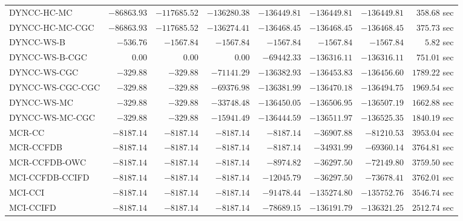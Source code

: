 \begin{table}[H]
\begin{tabular}{lrrrrrrr}
         DYNCC-HC-MC & $    -86863.93$ & $   -117685.52$ & $   -136280.38$ & $   -136449.81$ & $   -136449.81$ & $   -136449.81$ & $       358.68$ sec   \\ 
     DYNCC-HC-MC-CGC & $    -86863.93$ & $   -117685.52$ & $   -136274.41$ & $   -136468.45$ & $   -136468.45$ & $   -136468.45$ & $       375.73$ sec   \\ 
          DYNCC-WS-B & $      -536.76$ & $     -1567.84$ & $     -1567.84$ & $     -1567.84$ & $     -1567.84$ & $     -1567.84$ & $         5.82$ sec   \\ 
      DYNCC-WS-B-CGC & $         0.00$ & $         0.00$ & $         0.00$ & $    -69442.33$ & $   -136316.11$ & $   -136316.11$ & $       751.01$ sec   \\ 
        DYNCC-WS-CGC & $      -329.88$ & $      -329.88$ & $    -71141.29$ & $   -136382.93$ & $   -136453.83$ & $   -136456.60$ & $      1789.22$ sec   \\ 
    DYNCC-WS-CGC-CGC & $      -329.88$ & $      -329.88$ & $    -69376.98$ & $   -136381.99$ & $   -136470.18$ & $   -136494.75$ & $      1969.54$ sec   \\ 
         DYNCC-WS-MC & $      -329.88$ & $      -329.88$ & $    -33748.48$ & $   -136450.05$ & $   -136506.95$ & $   -136507.19$ & $      1662.88$ sec   \\ 
     DYNCC-WS-MC-CGC & $      -329.88$ & $      -329.88$ & $    -15941.49$ & $   -136444.59$ & $   -136511.97$ & $   -136525.35$ & $      1840.19$ sec   \\ 
\cmidrule{1-1} 
              MCR-CC & $     -8187.14$ & $     -8187.14$ & $     -8187.14$ & $     -8187.14$ & $    -36907.88$ & $    -81210.53$ & $      3953.04$ sec   \\ 
           MCR-CCFDB & $     -8187.14$ & $     -8187.14$ & $     -8187.14$ & $     -8187.14$ & $    -34931.99$ & $    -69360.14$ & $      3764.81$ sec   \\ 
       MCR-CCFDB-OWC & $     -8187.14$ & $     -8187.14$ & $     -8187.14$ & $     -8974.82$ & $    -36297.50$ & $    -72149.80$ & $      3759.50$ sec   \\ 
\cmidrule{1-1} 
     MCI-CCFDB-CCIFD & $     -8187.14$ & $     -8187.14$ & $     -8187.14$ & $    -12045.79$ & $    -36297.50$ & $    -73678.41$ & $      3762.01$ sec   \\ 
             MCI-CCI & $     -8187.14$ & $     -8187.14$ & $     -8187.14$ & $    -91478.44$ & $   -135274.80$ & $   -135752.76$ & $      3546.74$ sec   \\ 
           MCI-CCIFD & $     -8187.14$ & $     -8187.14$ & $     -8187.14$ & $    -78689.15$ & $   -136191.79$ & $   -136321.25$ & $      2512.74$ sec   \\ 
\bottomrule
\end{tabular}
\end{table}